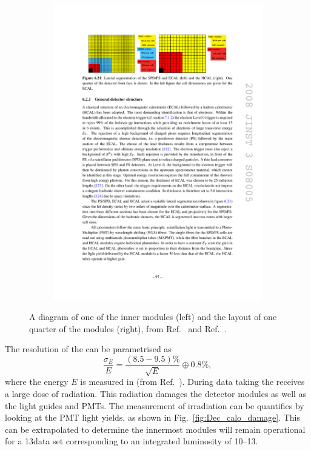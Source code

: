 \begin{figure}[!h]
\begin{subfigure}[m]{0.4\textwidth}
        \includegraphics[width=1.0\textwidth]{figs/Detector/ecal_layout.pdf}
    \end{subfigure}
    \caption{A diagram of one of the inner \ecal modules (left) and the layout of one quarter of the \ecal modules (right), from Ref.~\cite{Alves:2008zz} and Ref.~\cite{doi:1765047}.}
    \label{fig:Dec_ecal_layout}   
\end{figure}

The resolution of the \ecal can be parametrised as 
\begin{equation}
\frac{\sigma_{E}}{E} = \frac{(8.5-9.5)\%}{\sqrt{E}} \oplus 0.8\%,
\end{equation}
where the energy $E$ is measured in \gev (from Ref.~\cite{1748-0221-12-07-C07024}). During data taking the \ecal receives a large dose of radiation. This radiation damages the detector modules as well as the light guides and PMTs. The measurement of irradiation can be quantifies by looking at the PMT light yields, as shown in Fig.~\ref{fig:Dec_calo_damage}. This can be extrapolated to determine the innermost \ecal modules will remain operational for a 13\tev data set corresponding to an integrated luminosity of 10--13\invfb.   


